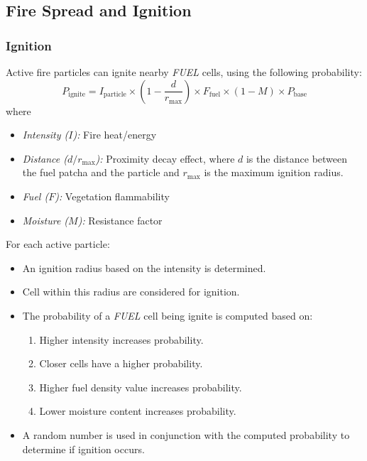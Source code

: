\subsection{Fire Spread and Ignition}
\subsubsection{Ignition}
Active fire particles can ignite nearby \textit{FUEL} cells, using the following probability:
\begin{equation}
	P_{\text{ignite}} = I_{\text{particle}} \times (1 - \frac{d}{r_{\text{max}}}) \times F_{\text{fuel}} \times (1 - M) \times P_{\text{base}}
	\label{eq:fire_ign}
\end{equation}
where
\begin{itemize}
	\item \textit{Intensity ($I$):} Fire heat/energy
	\item \textit{Distance ($d/r_{\text{max}}$):} Proximity decay effect, where $d$ is the distance between the fuel patcha and the particle and $r_{\text{max}}$ is the maximum ignition radius.
	\item \textit{Fuel ($F$):} Vegetation flammability
	\item \textit{Moisture ($M$):} Resistance factor
\end{itemize}

For each active particle:
\begin{itemize}
	\item An ignition radius based on the intensity is determined.
	\item Cell within this radius are considered for ignition.
	\item The probability of a \textit{FUEL} cell being ignite is computed based on:
	      \begin{enumerate}
		      \item Higher intensity increases probability.
		      \item Closer cells have a higher probability.
		      \item Higher fuel density value increases probability.
		      \item Lower moisture content increases probability.
	      \end{enumerate}
	\item A random number is used in conjunction with the computed probability to determine if ignition occurs.
\end{itemize}

